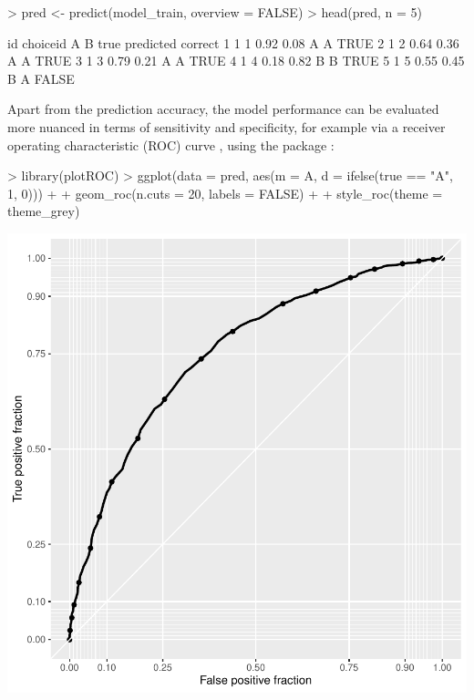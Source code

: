 \documentclass[article]{jss}
\begin{document}
\begin{Schunk}
\begin{Sinput}
> pred <- predict(model_train, overview = FALSE)
> head(pred, n = 5)
\end{Sinput}
\begin{Soutput}
  id choiceid    A    B true predicted correct
1  1        1 0.92 0.08    A         A    TRUE
2  1        2 0.64 0.36    A         A    TRUE
3  1        3 0.79 0.21    A         A    TRUE
4  1        4 0.18 0.82    B         B    TRUE
5  1        5 0.55 0.45    B         A   FALSE
\end{Soutput}
\end{Schunk}

Apart from the prediction accuracy, the model performance can be evaluated more nuanced in terms of sensitivity and specificity, for example via a receiver operating characteristic (ROC) curve \citep{Fawcett:2006}, using the  package \citep{Sachs:2017}:

\begin{Schunk}
\begin{Sinput}
> library(plotROC)
> ggplot(data = pred, aes(m = A, d = ifelse(true == "A", 1, 0))) +
+    geom_roc(n.cuts = 20, labels = FALSE) +
+    style_roc(theme = theme_grey)
\end{Sinput}
\end{Schunk}
\includegraphics{rprobitb_oelschlaeger_bauer-roc-example}
\end{document}
